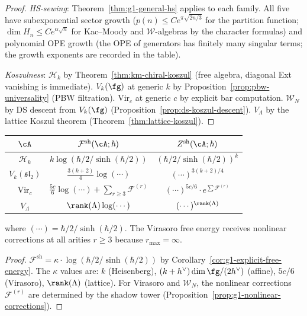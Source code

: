 \begin{proof}
\emph{HS-sewing}: Theorem~\ref{thm:g1-general-hs} applies to
each family.  All five have subexponential sector growth
($p(n) \leq Ce^{\pi\sqrt{2n/3}}$ for the partition function;
$\dim H_n \leq Ce^{\alpha\sqrt{n}}$ for Kac--Moody and
$\mathcal{W}$-algebras by the character formulas) and polynomial
OPE growth (the OPE of generators has finitely many singular
terms; the growth exponents are recorded in the table).

\emph{Koszulness}: $\mathcal{H}_k$ by
Theorem~\ref{thm:km-chiral-koszul} (free algebra, diagonal Ext
vanishing is immediate).
$V_k(\fg)$ at generic $k$ by
Proposition~\ref{prop:pbw-universality} (PBW filtration).
$\mathrm{Vir}_c$ at generic $c$ by explicit bar computation.
$\mathcal{W}_N$ by DS descent from $V_k(\fg)$
(Proposition~\ref{prop:ds-koszul-descent}).
$V_\Lambda$ by the lattice Koszul theorem
(Theorem~\ref{thm:lattice-koszul}).
\end{proof}

\begin{proposition}%
\label{prop:g1-explicit-shadow-families}%
%
\begin{center}
\renewcommand{\arraystretch}{1.4}
\begin{tabular}{c|c|c}
$\cA$ & $\mathcal{F}^{\mathrm{sh}}(\cA;\hbar)$ &
  $Z^{\mathrm{sh}}(\cA;\hbar)$
\\[2pt]\hline\hline
$\mathcal{H}_k$ &
  $k\log(\hbar/2/\sinh(\hbar/2))$ &
  $(\hbar/2/\sinh(\hbar/2))^k$
\\
$V_k(\mathfrak{sl}_2)$ &
  $\frac{3(k+2)}{4}\log(\cdots)$ &
  $(\cdots)^{3(k+2)/4}$
\\
$\mathrm{Vir}_c$ &
  $\frac{5c}{6}\log(\cdots)
  + \sum_{r \geq 3} \mathcal{F}^{(r)}$ &
  $(\cdots)^{5c/6} \cdot e^{\sum \mathcal{F}^{(r)}}$
\\
$V_\Lambda$ &
  $\rank(\Lambda)\log(\cdots)$ &
  $(\cdots)^{\rank(\Lambda)}$
\end{tabular}
\end{center}
where $(\cdots) = \hbar/2/\sinh(\hbar/2)$.  The Virasoro
free energy receives nonlinear corrections at all arities
$r \geq 3$ because $r_{\max} = \infty$.
\end{proposition}

\begin{proof}
$\mathcal{F}^{\mathrm{sh}} = \kappa \cdot
\log(\hbar/2/\sinh(\hbar/2))$ by
Corollary~\ref{cor:g1-explicit-free-energy}.  The $\kappa$
values are: $k$ (Heisenberg), $(k+h^\vee)\dim\fg/(2h^\vee)$
(affine), $5c/6$ (Virasoro), $\rank(\Lambda)$ (lattice).
For Virasoro and $\mathcal{W}_N$, the nonlinear corrections
$\mathcal{F}^{(r)}$ are determined by the shadow tower
(Proposition~\ref{prop:g1-nonlinear-corrections}).
\end{proof}

